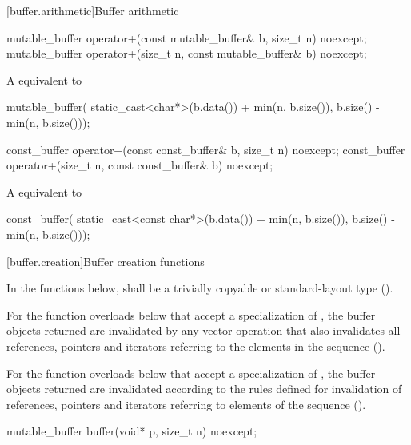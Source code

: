 [buffer.arithmetic]{Buffer arithmetic}

\begin{itemdecl}
mutable_buffer operator+(const mutable_buffer& b, size_t n) noexcept;
mutable_buffer operator+(size_t n, const mutable_buffer& b) noexcept;
\end{itemdecl}

\begin{itemdescr}
\pnum
\returns A  equivalent to
\begin{codeblock}
mutable_buffer(
  static_cast<char*>(b.data()) + min(n, b.size()),
  b.size() - min(n, b.size()));
\end{codeblock}

\end{itemdescr}

\begin{itemdecl}
const_buffer operator+(const const_buffer& b, size_t n) noexcept;
const_buffer operator+(size_t n, const const_buffer& b) noexcept;
\end{itemdecl}

\begin{itemdescr}
\pnum
\returns A  equivalent to
\begin{codeblock}
const_buffer(
  static_cast<const char*>(b.data()) + min(n, b.size()),
  b.size() - min(n, b.size()));
\end{codeblock}

\end{itemdescr}



[buffer.creation]{Buffer creation functions}

\pnum
In the functions below,  shall be a trivially copyable or standard-layout type ().

\pnum
For the function overloads below that accept
a specialization of ,
the buffer objects returned are invalidated by any vector operation that also invalidates all references, pointers and iterators referring to the elements in the sequence ().

\pnum
For the function overloads below that accept
a specialization of ,
the buffer objects returned are invalidated according to the rules defined for invalidation of references, pointers and iterators referring to elements of the sequence ().

%
\begin{itemdecl}
mutable_buffer buffer(void* p, size_t n) noexcept;
\end{itemdecl}

